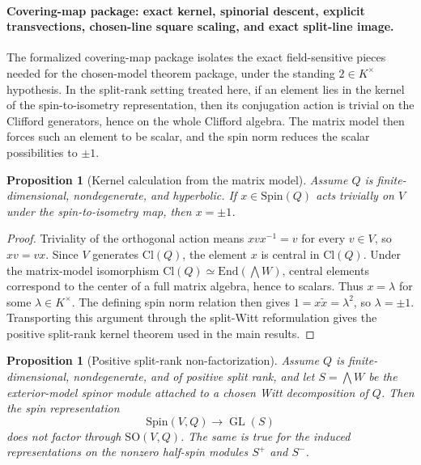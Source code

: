 \documentclass{birkjour}
\theoremstyle{plain}
\newtheorem{proposition}[theorem]{Proposition}
\theoremstyle{definition}
\theoremstyle{remark}
\newcommand{\Cl}{\mathrm{Cl}}
\newcommand{\Spin}{\mathrm{Spin}}
\newcommand{\SO}{\mathrm{SO}}
\newcommand{\End}{\mathrm{End}}
\begin{document}
\paragraph{Covering-map package: exact kernel, spinorial descent, explicit transvections, chosen-line square scaling, and exact split-line image.}
The formalized covering-map package isolates the exact field-sensitive pieces
needed for the chosen-model theorem package, under the standing
$2\in K^\times$ hypothesis. In the split-rank setting treated here, if an
element lies in the kernel of the spin-to-isometry representation, then its
conjugation action is trivial on the Clifford generators, hence on the whole
Clifford algebra. The matrix model then forces such an element to be scalar,
and the spin norm reduces the scalar possibilities to $\pm1$.

\begin{proposition}[Kernel calculation from the matrix model]
\label{prop:kernel-from-matrix}
Assume $Q$ is finite-dimensional, nondegenerate, and hyperbolic. If
$x\in \Spin(Q)$ acts trivially on $V$ under the spin-to-isometry map, then
$x=\pm1$.
\end{proposition}

\begin{proof}
Triviality of the orthogonal action means $xvx^{-1}=v$ for every $v\in V$, so
$xv=vx$. Since $V$ generates $\Cl(Q)$, the element $x$ is central in
$\Cl(Q)$. Under the matrix-model isomorphism
$\Cl(Q)\simeq \End(\bigwedge W)$, central elements correspond to the center of a
full matrix algebra, hence to scalars. Thus $x=\lambda$ for some
$\lambda\in K^\times$. The defining spin norm relation then gives
$1=x\tilde x=\lambda^2$, so $\lambda=\pm1$. Transporting this argument through
the split-Witt reformulation gives the positive split-rank kernel theorem used in the
main results.
\end{proof}

\begin{proposition}[Positive split-rank non-factorization]
\label{prop:nonfactorization}
Assume $Q$ is finite-dimensional, nondegenerate, and of positive split rank,
and let $S=\bigwedge W$ be the exterior-model spinor module attached to a
chosen Witt decomposition of $Q$. Then the spin representation
\[
  \Spin(V,Q)\to \operatorname{GL}(S)
\]
does not factor through $\SO(V,Q)$. The same is true for the induced
representations on the nonzero half-spin modules $S^+$ and $S^-$.
\end{proposition}
\end{document}
